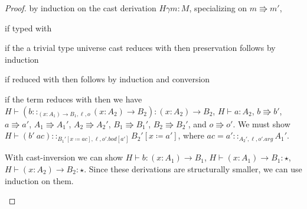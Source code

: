 \begin{proof}
 by induction on the cast derivation $H\gamma m:M$, specializing on $m\Rrightarrow m'$,
 
\begin{casenv}
 \item if typed with 
 \begin{casenv}
   \item if the a trivial type universe cast reduces with  then preservation follows by induction
   \item if reduced with  then follows by induction and conversion
 \end{casenv}
 \item {}
 \begin{casenv}
   \item if the term reduces with  then we have
   $H\vdash\left(b::_{\left(x:A_{1}\right)\rightarrow B_{1},\ell ,o}\left(x:A_{2}\right)\rightarrow B_{2}\right):\left(x:A_{2}\right)\rightarrow B_{2}$,
   $H\vdash a:A_{2}$,
   $b\Rrightarrow b'$, $a\Rrightarrow a'$, $A_{1}\Rrightarrow A_{1}'$,
   $A_{2}\Rrightarrow A_{2}'$, $B_{1}\Rrightarrow B_{1}'$,  $B_{2}\Rrightarrow B_{2}'$,
   and $o\Rrightarrow o'$.
   We must show $H\vdash\left(b'\ ac\right)::_{B_{1}'\left[x\coloneqq ac\right],\ell ,o'.bod[a']}B_{2}'\left[x\coloneqq a'\right]$, where $ac=a'::_{A_{2}',\ell,o'.arg}A_{1}'$.
  
   With cast-inversion we can show $H\vdash b:\left(x:A_{1}\right)\rightarrow B_{1}$, $H\vdash\left(x:A_{1}\right)\rightarrow B_{1}:\star$,
   $H\vdash\left(x:A_{2}\right)\rightarrow B_{2}:\star$.
   Since these derivations are structurally smaller, we can use induction on them.
 

\end{casenv}
\end{casenv}
\end{proof}

